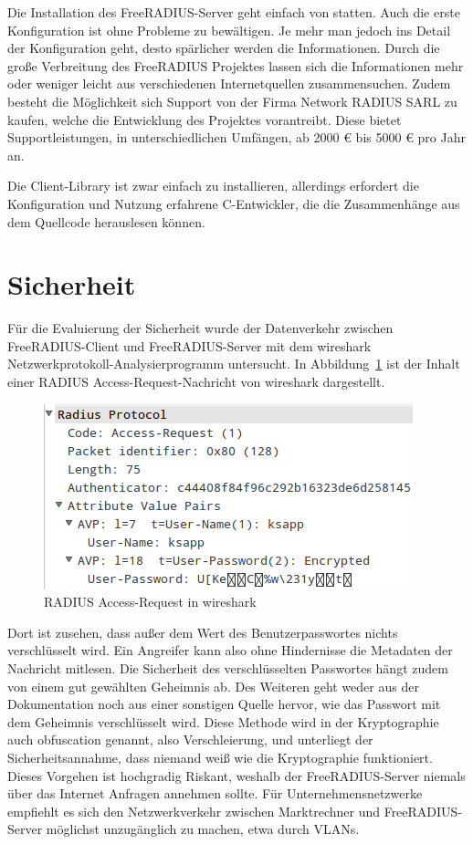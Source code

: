 \documentclass[11pt,a4paper]{report}
\begin{document}
Die Installation des FreeRADIUS-Server geht einfach von statten. Auch die erste Konfiguration ist ohne Probleme zu bewältigen. Je mehr man jedoch ins Detail der Konfiguration geht, desto spärlicher werden die Informationen. Durch die große Verbreitung des FreeRADIUS Projektes lassen sich die Informationen mehr oder weniger leicht aus verschiedenen Internetquellen zusammensuchen. Zudem besteht die Möglichkeit sich Support von der Firma Network RADIUS SARL zu kaufen, welche die Entwicklung des Projektes vorantreibt. Diese bietet Supportleistungen, in unterschiedlichen Umfängen, ab 2000 € bis 5000 € pro Jahr an.

Die Client-Library ist zwar einfach zu installieren, allerdings erfordert die Konfiguration und Nutzung erfahrene C-Entwickler, die die Zusammenhänge aus dem Quellcode herauslesen können. 

\section{Sicherheit}

Für die Evaluierung der Sicherheit wurde der Datenverkehr zwischen FreeRADIUS-Client und FreeRADIUS-Server mit dem wireshark Netzwerkprotokoll-Analysierprogramm untersucht. In Abbildung~\ref{fig:radius_wire} ist der Inhalt einer RADIUS Access-Request-Nachricht von wireshark dargestellt.

\begin{figure}[htbp]
\centering
\includegraphics[scale=1]{images/radius_request_wireshark.png}
\caption{RADIUS Access-Request in wireshark}
\label{fig:radius_wire}
\end{figure}

Dort ist zusehen, dass außer dem Wert des Benutzerpasswortes nichts verschlüsselt wird. Ein Angreifer kann also ohne Hindernisse die Metadaten der Nachricht mitlesen. Die Sicherheit des verschlüsselten Passwortes hängt zudem von einem gut gewählten Geheimnis ab. Des Weiteren geht weder aus der Dokumentation noch aus einer sonstigen Quelle hervor, wie das Passwort mit dem Geheimnis verschlüsselt wird. Diese Methode wird in der Kryptographie auch obfuscation genannt, also Verschleierung, und unterliegt der Sicherheitsannahme, dass niemand weiß wie die Kryptographie funktioniert. Dieses Vorgehen ist hochgradig Riskant, weshalb der FreeRADIUS-Server niemals über das Internet Anfragen annehmen sollte. Für Unternehmensnetzwerke empfiehlt es sich den Netzwerkverkehr zwischen Marktrechner und FreeRADIUS-Server möglichst unzugänglich zu machen, etwa durch VLANs.
\end{document}
